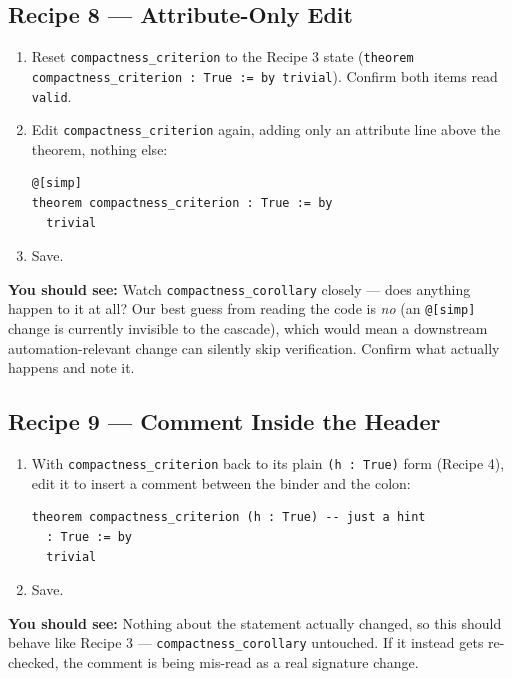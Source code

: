 \documentclass[11pt]{article}
\newcommand{\code}[1]{\texttt{#1}}
\newcommand{\see}[1]{\textbf{You should see:} #1}
\begin{document}
\subsection*{Recipe 8 --- Attribute-Only Edit}
\begin{enumerate}[label=\arabic*.]
  \item Reset \code{compactness\_criterion} to the Recipe 3 state
    (\code{theorem compactness\_criterion : True := by trivial}). Confirm
    both items read \code{valid}.
  \item Edit \code{compactness\_criterion} again, adding only an attribute
    line above the theorem, nothing else:
\begin{verbatim}
@[simp]
theorem compactness_criterion : True := by
  trivial
\end{verbatim}
  \item Save.
\end{enumerate}
\see{Watch \code{compactness\_corollary} closely --- does anything happen to
it at all? Our best guess from reading the code is \emph{no} (an
\code{@[simp]} change is currently invisible to the cascade), which would
mean a downstream automation-relevant change can silently skip
verification. Confirm what actually happens and note it.}

\subsection*{Recipe 9 --- Comment Inside the Header}
\begin{enumerate}[label=\arabic*.]
  \item With \code{compactness\_criterion} back to its plain
    \code{(h : True)} form (Recipe 4), edit it to insert a comment between
    the binder and the colon:
\begin{verbatim}
theorem compactness_criterion (h : True) -- just a hint
  : True := by
  trivial
\end{verbatim}
  \item Save.
\end{enumerate}
\see{Nothing about the statement actually changed, so this should behave
like Recipe 3 --- \code{compactness\_corollary} untouched. If it instead
gets re-checked, the comment is being mis-read as a real signature change.}
\end{document}
